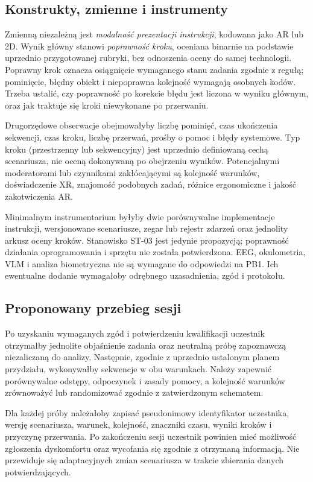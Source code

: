 \documentclass[11pt,a4paper]{article}
\begin{document}
\subsection{Konstrukty, zmienne i instrumenty}
Zmienną niezależną jest \emph{modalność prezentacji instrukcji}, kodowana jako AR lub 2D. Wynik główny stanowi \emph{poprawność kroku}, oceniana binarnie na podstawie uprzednio przygotowanej rubryki, bez odnoszenia oceny do samej technologii. Poprawny krok oznacza osiągnięcie wymaganego stanu zadania zgodnie z regułą; pominięcie, błędny obiekt i niepoprawna kolejność wymagają osobnych kodów. Trzeba ustalić, czy poprawność po korekcie błędu jest liczona w wyniku głównym, oraz jak traktuje się kroki niewykonane po przerwaniu.

Drugorzędowe obserwacje obejmowałyby liczbę pominięć, czas ukończenia sekwencji, czas kroku, liczbę przerwań, prośby o pomoc i błędy systemowe. Typ kroku (przestrzenny lub sekwencyjny) jest uprzednio definiowaną cechą scenariusza, nie oceną dokonywaną po obejrzeniu wyników. Potencjalnymi moderatorami lub czynnikami zakłócającymi są kolejność warunków, doświadczenie XR, znajomość podobnych zadań, różnice ergonomiczne i jakość zakotwiczenia AR.

Minimalnym instrumentarium byłyby dwie porównywalne implementacje instrukcji, wersjonowane scenariusze, zegar lub rejestr zdarzeń oraz jednolity arkusz oceny kroków. Stanowisko ST-03 jest jedynie propozycją; poprawność działania oprogramowania i sprzętu nie została potwierdzona. EEG, okulometria, VLM i analiza biometryczna nie są wymagane do odpowiedzi na PB1. Ich ewentualne dodanie wymagałoby odrębnego uzasadnienia, zgód i protokołu.

\subsection{Proponowany przebieg sesji}
Po uzyskaniu wymaganych zgód i potwierdzeniu kwalifikacji uczestnik otrzymałby jednolite objaśnienie zadania oraz neutralną próbę zapoznawczą niezaliczaną do analizy. Następnie, zgodnie z uprzednio ustalonym planem przydziału, wykonywałby sekwencje w obu warunkach. Należy zapewnić porównywalne odstępy, odpoczynek i zasady pomocy, a kolejność warunków zrównoważyć lub randomizować zgodnie z zatwierdzonym schematem.

Dla każdej próby należałoby zapisać pseudonimowy identyfikator uczestnika, wersję scenariusza, warunek, kolejność, znaczniki czasu, wyniki kroków i przyczynę przerwania. Po zakończeniu sesji uczestnik powinien mieć możliwość zgłoszenia dyskomfortu oraz wycofania się zgodnie z otrzymaną informacją. Nie przewiduje się adaptacyjnych zmian scenariusza w trakcie zbierania danych potwierdzających.
\end{document}
